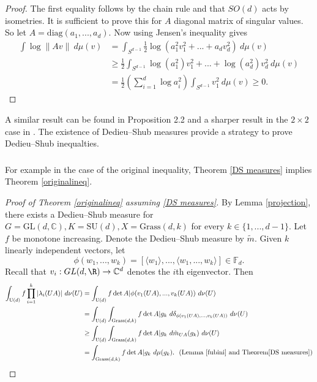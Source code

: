 \documentclass[10pt]{amsart}
\numberwithin{equation}{section}     %
\newcommand{\C}{\mathbb{C}}
\newcommand{\FF}{\mathbb{F}}
\newcommand{\GL}{\mathrm{GL}}
\newcommand{\SU}{\mathrm{SU}}
\newcommand{\U}{\mathrm{U}}
\newcommand{\Grass}{\mathrm{Grass}}
\begin{document}
\begin{proof}
    The first equality follows by the chain rule and that $SO(d)$ acts by isometries. It is sufficient to prove this for $A$ diagonal matrix of singular values. So let $A = \mathrm{diag}(a_1,...,a_d)$. Now using Jensen's inequality gives \begin{align*}
        \int \log \|Av\| \ d\mu(v) &= \int_{S^{d-1}} \frac{1}{2} \log (a_1^2v_1^2 + ... + a_d v_d^2) \ d\mu(v)\\
        & \geq \frac{1}{2} \int_{S^{d-1}}\log(a_1^2)v_1^2 + ... + \log(a_d^2)v_d^2 \ d\mu(v) \\
        &= \frac{1}{2} \left( \sum \limits_{i=1}^d \log a_i^2 \right) \int_{S^{d-1}} v_1^2 \ d\mu(v) 
        \geq 0. 
    \end{align*}
\end{proof}

A similar result can be found in \cite{ledrappier2003random} Proposition 2.2 and a sharper result in the $2\times 2$ case in \cite{AvilaBochiFormula}. The existence of Dedieu--Shub measures provide a strategy to prove Dedieu--Shub inequalties.

\subsubsection{} 

For example in the case of the original inequality, Theorem \ref{DS measures} implies Theorem \ref{originalineq}. 

\begin{proof}[Proof of Theorem \ref{originalineq} assuming \ref{DS measures}] \label{proof1.3}
    By Lemma \ref{projection}, there exists a Dedieu--Shub measure for $G = \GL(d,\C), K = \SU(d), X = \Grass(d,k)$ for every $k \in \{1,...,d-1\}.$ Let $f$ be monotone increasing. Denote the Dedieu--Shub measure by $\tilde{m}$. Given $k$ linearly independent vectors, let $$\phi(w_1,...,w_k) = [\langle w_1 \rangle,...,\langle w_1,...,w_k \rangle] \in \FF_d.$$ Recall that $v_i: GL(d,\R) \to \C^d$ denotes the $i$th eigenvector. Then \begin{align*}
        \int_{\U(d)} f \prod \limits_{i=1}^k |\lambda_i(UA)| \ d\nu(U) &= \int_{\U(d)} f \det A| \phi(v_1(UA),...,v_k(UA))  \ d\nu(U) \\
        &= \int_{\U(d)} \int_{\Grass(d,k)}f \det A| g_k \ d \delta_{\phi(v_1(UA),...,v_k(UA))}  \ d\nu(U) \\
        & \geq \int_{\U(d)} \int_{\Grass(d,k)} f \det A| g_k \ d\tilde{m}_{UA}(g_k) \ d\nu(U) \\
        &= \int_{\Grass(d,k)} f \det A| g_k \ d\mu(g_k). \ \ (\text{Lemma} \ \ref{fubini} \ \text{and} \ \text{Theorem} \ref{DS measures})
    \end{align*}
\end{proof}
\end{document}

